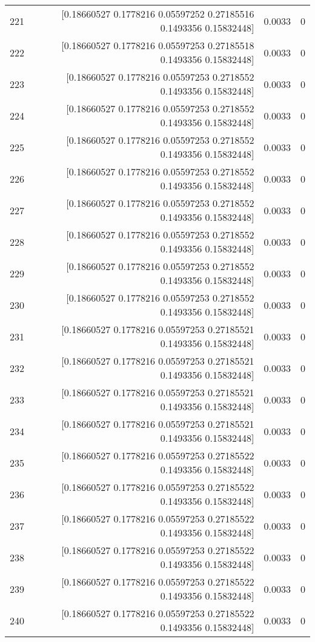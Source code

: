 \begin{longtable}{lrrr}
221 & [0.18660527 0.1778216  0.05597252 0.27185516 0.1493356  0.15832448] & 0.0033 & 0 \\
222 & [0.18660527 0.1778216  0.05597253 0.27185518 0.1493356  0.15832448] & 0.0033 & 0 \\
223 & [0.18660527 0.1778216  0.05597253 0.2718552  0.1493356  0.15832448] & 0.0033 & 0 \\
224 & [0.18660527 0.1778216  0.05597253 0.2718552  0.1493356  0.15832448] & 0.0033 & 0 \\
225 & [0.18660527 0.1778216  0.05597253 0.2718552  0.1493356  0.15832448] & 0.0033 & 0 \\
226 & [0.18660527 0.1778216  0.05597253 0.2718552  0.1493356  0.15832448] & 0.0033 & 0 \\
227 & [0.18660527 0.1778216  0.05597253 0.2718552  0.1493356  0.15832448] & 0.0033 & 0 \\
228 & [0.18660527 0.1778216  0.05597253 0.2718552  0.1493356  0.15832448] & 0.0033 & 0 \\
229 & [0.18660527 0.1778216  0.05597253 0.2718552  0.1493356  0.15832448] & 0.0033 & 0 \\
230 & [0.18660527 0.1778216  0.05597253 0.2718552  0.1493356  0.15832448] & 0.0033 & 0 \\
231 & [0.18660527 0.1778216  0.05597253 0.27185521 0.1493356  0.15832448] & 0.0033 & 0 \\
232 & [0.18660527 0.1778216  0.05597253 0.27185521 0.1493356  0.15832448] & 0.0033 & 0 \\
233 & [0.18660527 0.1778216  0.05597253 0.27185521 0.1493356  0.15832448] & 0.0033 & 0 \\
234 & [0.18660527 0.1778216  0.05597253 0.27185521 0.1493356  0.15832448] & 0.0033 & 0 \\
235 & [0.18660527 0.1778216  0.05597253 0.27185522 0.1493356  0.15832448] & 0.0033 & 0 \\
236 & [0.18660527 0.1778216  0.05597253 0.27185522 0.1493356  0.15832448] & 0.0033 & 0 \\
237 & [0.18660527 0.1778216  0.05597253 0.27185522 0.1493356  0.15832448] & 0.0033 & 0 \\
238 & [0.18660527 0.1778216  0.05597253 0.27185522 0.1493356  0.15832448] & 0.0033 & 0 \\
239 & [0.18660527 0.1778216  0.05597253 0.27185522 0.1493356  0.15832448] & 0.0033 & 0 \\
240 & [0.18660527 0.1778216  0.05597253 0.27185522 0.1493356  0.15832448] & 0.0033 & 0 \\

\end{longtable}
